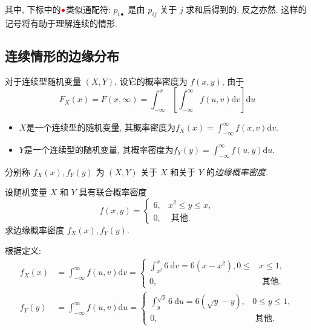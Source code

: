     其中, 下标中的${{\color{red}\bullet}}$类似通配符: $p_{i\bullet}$ 是由 $p_{i j}$ 关于 $j$ 求和后得到的, 反之亦然. 这样的记号将有助于理解连续的情形.

    \subsection{连续情形的边缘分布}

    \begin{definition*}
      对于连续型随机变量 $(X, Y)$, 设它的概率密度为 $f(x, y)$, 由于
        $$
            F_X(x)=F(x, \infty)=\int_{-\infty}^x\left[\int_{-\infty}^{\infty} f(u, v) \mathrm{d} v\right] \mathrm{d} u
        $$

        \begin{itemize}
            \item $X$是一个连续型的随机变量, 其概率密度为$f_X(x)=\int_{-\infty}^{\infty} f(x, v) \mathrm{d} v$.
            \item $Y$是一个连续型的随机变量, 其概率密度为$f_Y(y)=\int_{-\infty}^{\infty} f(u, y) \mathrm{d} u$.
        \end{itemize}

        分别称 $f_X(x), f_Y(y)$ 为 $(X, Y)$ 关于 $X$ 和关于 $Y$ 的\emph{边缘概率密度.}
    \end{definition*}

    \begin{example}
      设随机变量 $X$ 和 $Y$ 具有联合概率密度
            $$
                f(x, y)= \begin{cases}6, & x^2 \leq y \leq x, \\ 0, & \text { 其他. }\end{cases}
            $$
            求边缘概率密度 $f_X(x), f_Y(y)$.
    \end{example}

    \begin{solution}根据定义:
      $$\begin{aligned}
              f_X(x) & =\int_{-\infty}^{\infty} f(u, v) \mathrm{d} v= \begin{cases}\int_{x^2}^x 6 \mathrm{~d} v=6\left(x-x^2\right), 0 \leq & x \leq 1, \\
           0,                                                            & \text { 其他. }\end{cases}               \\
              f_Y(y) & =\int_{-\infty}^{\infty} f(u, v) \mathrm{d} u = \begin{cases}\int_y^{\sqrt{y}} 6 \mathrm{~d} u=6(\sqrt{y}-y), & 0 \leq y \leq 1, \\
           0,                                               & \text { 其他. }\end{cases}
          \end{aligned}
      $$
  \end{solution}

